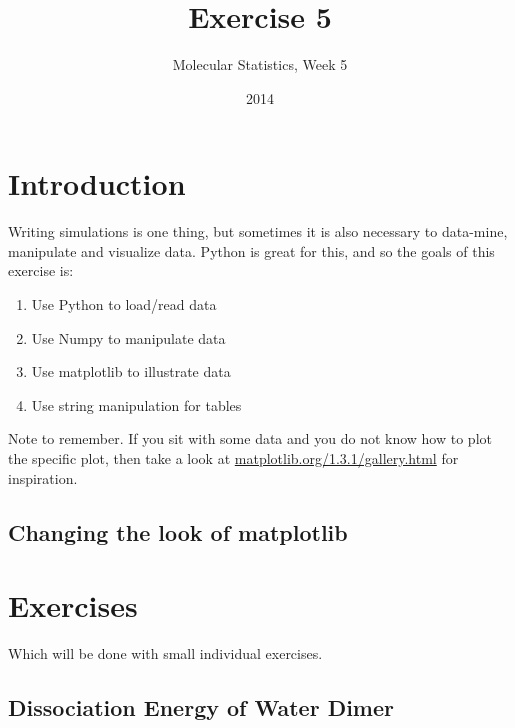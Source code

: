 \documentclass{article}
\title{Exercise 5}
\author{Molecular Statistics, Week 5}
\date{2014}
\begin{document}

\maketitle

\section{Introduction}

Writing simulations is one thing, but sometimes it is also necessary to data-mine, manipulate and visualize data.
Python is great for this, and so the goals of this exercise is:

\begin{enumerate}
    \item Use Python to load/read data

    \item Use Numpy to manipulate data

    \item Use matplotlib to illustrate data

    \item Use string manipulation for tables


\end{enumerate}


Note to remember.
If you sit with some data and you do not know how to plot the specific plot, then take a look at
\href{http://matplotlib.org/1.3.1/gallery.html}{matplotlib.org/1.3.1/gallery.html} for inspiration.



\subsection{Changing the look of matplotlib}






\newpage
\section{Exercises}

Which will be done with small individual exercises.


\subsection{Dissociation Energy of Water Dimer}
\end{document}
